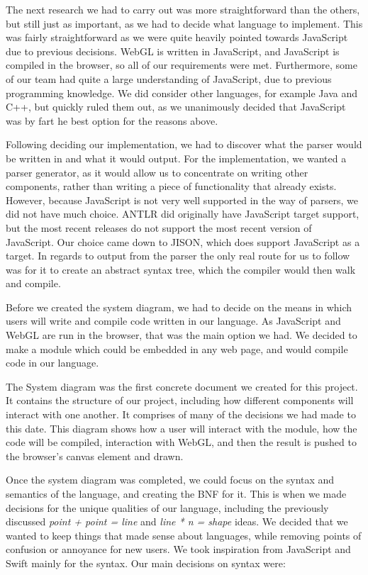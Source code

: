 \documentclass{l3proj}
\begin{document}
The next research we had to carry out was more straightforward than the others, but still just as important, as we had to decide what language to implement. This was fairly straightforward as we were quite heavily pointed towards JavaScript due to previous decisions. WebGL is written in JavaScript, and JavaScript is compiled in the browser, so all of our requirements were met. Furthermore, some of our team had quite a large understanding of JavaScript, due to previous programming knowledge. We did consider other languages, for example Java and C++, but quickly ruled them out, as we unanimously decided that JavaScript was by fart he best option for the reasons above. 

Following deciding our implementation, we had to discover what the parser would be written in and what it would output. For the implementation, we wanted a parser generator, as it would allow us to concentrate on writing other components, rather than writing a piece of functionality that already exists. However, because JavaScript is not very well supported in the way of parsers, we did not have much choice. ANTLR did originally have JavaScript target support, but the most recent releases do not support the most recent version of JavaScript. Our choice came down to JISON, which does support JavaScript as a target. In regards to output from the parser the only real route for us to follow was for it to create an abstract syntax tree, which the compiler would then walk and compile.

Before we created the system diagram, we had to decide on the means in which users will write and compile code written in our language. As JavaScript and WebGL are run in the browser, that was the main option we had. We decided to make a module which could be embedded in any web page, and would compile code in our language.

The System diagram was the first concrete document we created for this project. It contains the structure of our project, including how different components will interact with one another. It comprises of many of the decisions we had made to this date. This diagram shows how a user will interact with the module, how the code will be compiled, interaction with WebGL, and then the result is pushed to the browser's canvas element and drawn.

Once the system diagram was completed, we could focus on the syntax and semantics of the language, and creating the BNF for it. This is when we made decisions for the unique qualities of our language, including the previously discussed \textit{point + point = line} and \textit{line * n = shape} ideas. We decided that we wanted to keep things that made sense about languages, while removing points of confusion or annoyance for new users. We took inspiration from JavaScript and Swift mainly for the syntax. Our main decisions on syntax were:
\end{document}
